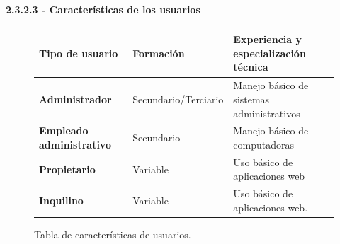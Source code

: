 \paragraph{2.3.2.3 - Características de los usuarios}

\begin{figure}[H]
    \centering
    \begin{tabularx}{\textwidth}{|l|l|X|}
    \hline
            \textbf{Tipo de usuario} 
        
        & 
\textbf{Formación} 
        
        & 
\textbf{Experiencia y especialización técnica} 
        
    \\ \hline
    
            \textbf{Administrador} 
        
        & 
        
            Secundario/Terciario 
        
        & 
        
            Manejo básico de sistemas administrativos 
        
    \\ \hline
    
            \textbf{Empleado administrativo} 
        
        & 
        
            Secundario 
        
        & 
        
            Manejo básico de computadoras 
        
    \\ \hline
    
            \textbf{Propietario} 
        
        & 
        
            Variable 
        
        & 
        
            Uso básico de aplicaciones web 
        
    \\ \hline
    
            \textbf{Inquilino} 
        
        & 
        
            Variable 
        
        & 
        
            Uso básico de aplicaciones web. 
        
    \\ \hline
    \end{tabularx}
    \caption{Tabla de características de usuarios.}
\end{figure}
